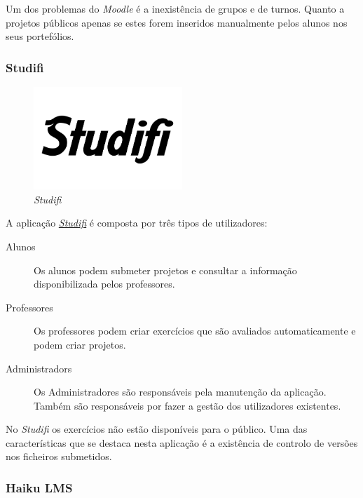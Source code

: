 Um dos problemas do \emph{Moodle} é a inexistência de grupos e de turnos. Quanto a projetos públicos apenas se estes forem inseridos manualmente pelos alunos nos seus portefólios.

\subsubsection{Studifi}
\label{ssub:studifi}

\begin{figure}[H]
        \centering
        \includegraphics[width=0.5\textwidth]{images/concorrencia/studifi.png}
         \caption{\emph{Studifi}}
         \label{fig: studifi}
\end{figure}

A aplicação \href{https://studifi.com/}{\emph{Studifi}} é composta por três tipos de utilizadores:

\begin{description}
	\item[Alunos] Os alunos podem submeter projetos e consultar a informação disponibilizada pelos professores.
	\item[Professores] Os professores podem criar exercícios que são avaliados automaticamente e podem criar projetos.
	\item[Administradors] Os Administradores são responsáveis pela manutenção da aplicação. Também são responsáveis por fazer a gestão dos utilizadores existentes.
\end{description}

No \emph{Studifi} os exercícios não estão disponíveis para o público. Uma das características que se destaca nesta aplicação é a existência de controlo de versões nos ficheiros submetidos.

\subsubsection{Haiku LMS}
\label{ssub:haiku_lms}

